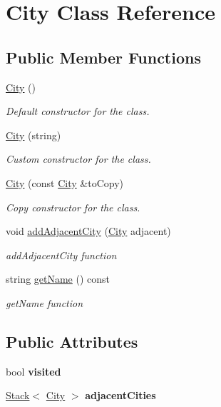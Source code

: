 \hypertarget{class_city}{}\section{City Class Reference}
\label{class_city}
\subsection*{Public Member Functions}
\begin{DoxyCompactItemize}
\item 
\hyperlink{class_city_a1b1f549430f0a7ecd0ec7b1605415193}{City} ()
\begin{DoxyCompactList}\small\item\em Default constructor for the class. \end{DoxyCompactList}\item 
\hyperlink{class_city_a229bbfb90d196dd02a9699625bb86ae5}{City} (string)
\begin{DoxyCompactList}\small\item\em Custom constructor for the class. \end{DoxyCompactList}\item 
\hyperlink{class_city_a2401eee13bc31fb10f4236790c7ecb03}{City} (const \hyperlink{class_city}{City} \&to\+Copy)
\begin{DoxyCompactList}\small\item\em Copy constructor for the class. \end{DoxyCompactList}\item 
void \hyperlink{class_city_a14c86786f56c6653d8ad38db67e09c0d}{add\+Adjacent\+City} (\hyperlink{class_city}{City} adjacent)
\begin{DoxyCompactList}\small\item\em add\+Adjacent\+City function \end{DoxyCompactList}\item 
string \hyperlink{class_city_a4843313c0238390843ae5760ec5b6561}{get\+Name} () const
\begin{DoxyCompactList}\small\item\em get\+Name function \end{DoxyCompactList}\end{DoxyCompactItemize}
\subsection*{Public Attributes}
\begin{DoxyCompactItemize}
\item 
\hypertarget{class_city_a3ad0293cf12ceb3e9754b93f78c019ac}{}\label{class_city_a3ad0293cf12ceb3e9754b93f78c019ac} 
bool {\bfseries visited}
\item 
\hypertarget{class_city_acd96750e827d7bee9d46e51aa80a19f6}{}\label{class_city_acd96750e827d7bee9d46e51aa80a19f6} 
\hyperlink{class_stack}{Stack}$<$ \hyperlink{class_city}{City} $>$ {\bfseries adjacent\+Cities}
\end{DoxyCompactItemize}

